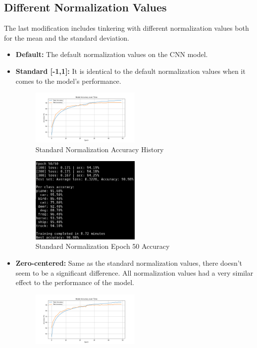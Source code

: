 \subsection{Different Normalization Values}
The last modification includes tinkering with different normalization values both for the mean and
the standard deviation.\\
\begin{itemize}
    \item \textbf{Default:} The default normalization values on the CNN model.
    \item \textbf{Standard [-1,1]:} It is identical to the default normalization values when it comes
    to the model's performance.
    \begin{figure}[H]
        \centering
        \includegraphics[width=0.5\textwidth]{media/cifar10_cnn_std_accuracy.png}
        \caption{Standard Normalization Accuracy History}
    \end{figure}
    \begin{figure}[H]
        \centering
        \includegraphics[width=0.5\textwidth]{media/cnn_std_epoch_50.png}
        \caption{Standard Normalization Epoch 50 Accuracy}
    \end{figure}
    \item \textbf{Zero-centered:} Same as the standard normalization values, there doesn't seem to be
    a significant difference. All normalization values had a very similar effect to the performance of
    the model.
    \begin{figure}[H]
        \centering
        \includegraphics[width=0.5\textwidth]{media/cifar10_cnn_zero_accuracy.png}

\end{figure}
\end{itemize}
